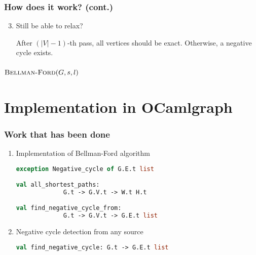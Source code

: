 \documentclass{beamer}
\begin{document}
\begin{frame}\frametitle{How does it work? (cont.)}

\begin{enumerate}
\setcounter{enumi}{2}

\item \alert{Still be able to relax?}

After $(|V|-1)$-th pass, all vertices should be exact.
Otherwise, a negative cycle exists.

\end{enumerate}

\end{frame}

\begin{frame}\frametitle{$\mbox{\sc Bellman-Ford}(G,s,l)$}

\begin{algorithmic}[1]
\ENDFOR
\ENDFOR
{}
\ENDIF
\ENDFOR
{}
\end{algorithmic}

\cite[p.~532]{algo}

\end {frame}

\section{Implementation in OCamlgraph}
\frame{\sectionpage}

\begin{frame}[fragile]\frametitle{Work that has been done}

\begin{enumerate}
\item Implementation of Bellman-Ford algorithm

\begin{lstlisting}[language=Ocaml]
exception Negative_cycle of G.E.t list

val all_shortest_paths:
             G.t -> G.V.t -> W.t H.t

val find_negative_cycle_from:
             G.t -> G.V.t -> G.E.t list
\end{lstlisting} \vspace*{10pt}

\pause
\item Negative cycle detection from any source

\begin{lstlisting}[language=Ocaml]
val find_negative_cycle: G.t -> G.E.t list
\end{lstlisting}

\end{enumerate}

\end{frame}
\end{document}
